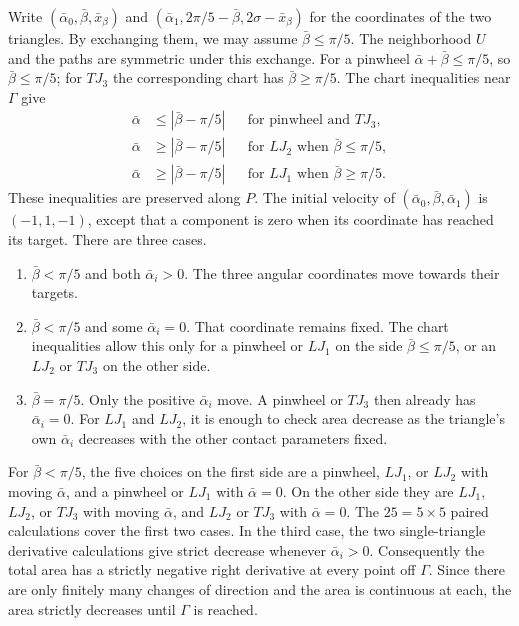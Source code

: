 Write $(\bar\alpha_0,\bar\beta,\bar x_\beta)$ and
$(\bar\alpha_1,2\pi/5-\bar\beta,2\sigma-\bar x_\beta)$ for the
coordinates of the two triangles. By exchanging them, we may assume
$\bar\beta\le\pi/5$. The neighborhood $U$ and the paths are symmetric
under this exchange. For a pinwheel $\bar\alpha+\bar\beta\le\pi/5$,
so $\bar\beta\le\pi/5$; for $TJ_3$ the corresponding chart has
$\bar\beta\ge\pi/5$. The chart inequalities near $\Gamma$ give
\[
\begin{aligned}
\bar\alpha&\le|\bar\beta-\pi/5|
 &&\text{for pinwheel and $TJ_3$},\\
\bar\alpha&\ge|\bar\beta-\pi/5|
 &&\text{for $LJ_2$ when $\bar\beta\le\pi/5$},\\
\bar\alpha&\ge|\bar\beta-\pi/5|
 &&\text{for $LJ_1$ when $\bar\beta\ge\pi/5$}.
\end{aligned}
\]
These inequalities are preserved along $P$. The initial velocity of
$(\bar\alpha_0,\bar\beta,\bar\alpha_1)$ is $(-1,1,-1)$, except
that a component is zero when its coordinate has reached its target.
There are three cases.
\begin{enumerate}
\item $\bar\beta<\pi/5$ and both $\bar\alpha_i>0$. The three
  angular coordinates move towards their targets.
\item $\bar\beta<\pi/5$ and some $\bar\alpha_i=0$. That coordinate
  remains fixed. The chart inequalities allow this only for a
  pinwheel or $LJ_1$ on the side $\bar\beta\le\pi/5$, or an
  $LJ_2$ or $TJ_3$ on the other side.
\item $\bar\beta=\pi/5$. Only the positive $\bar\alpha_i$ move.
  A pinwheel or $TJ_3$ then already has $\bar\alpha_i=0$.
  For $LJ_1$ and $LJ_2$, it is enough to check area decrease as
  the triangle's own $\bar\alpha_i$ decreases with the other
  contact parameters fixed.
\end{enumerate}
For $\bar\beta<\pi/5$, the five choices on the first side are a
pinwheel, $LJ_1$, or $LJ_2$ with moving $\bar\alpha$, and a pinwheel
or $LJ_1$ with $\bar\alpha=0$. On the other side they are $LJ_1$,
$LJ_2$, or $TJ_3$ with moving $\bar\alpha$, and $LJ_2$ or $TJ_3$ with
$\bar\alpha=0$. The $25=5\times5$ paired calculations cover the first
two cases. In the third case, the two
single-triangle derivative calculations give strict decrease
whenever $\bar\alpha_i>0$. Consequently the total area has a
strictly negative right derivative at every point off $\Gamma$.
Since there are only finitely many changes of direction and the
area is continuous at each, the area strictly decreases until
$\Gamma$ is reached.

